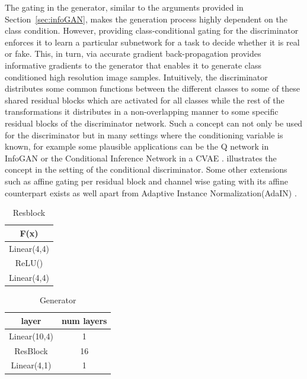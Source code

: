 The gating in the generator, similar to the arguments provided in Section~\ref{sec:infoGAN}, makes the generation process highly dependent on the class condition. However, providing class-conditional gating for the discriminator enforces it to learn a particular subnetwork for a task to decide whether it is real or fake. This, in turn, via accurate gradient back-propagation provides informative gradients to the generator that enables it to generate class conditioned high resolution image samples. Intuitively, the discriminator distributes some common functions between the different classes to some of these shared residual blocks which are activated for all classes while the rest of the transformations it distributes in a non-overlapping manner to some specific residual blocks of the discriminator network. Such a concept can not only be used for the discriminator but in many settings where the conditioning variable is known, for example some plausible applications can be the Q network in InfoGAN\cite{chen2016infogan} or the Conditional Inference Network in a CVAE \cite{sohn2015learning}.  illustrates the concept in the setting of the conditional discriminator. Some other extensions such as affine gating per residual block and channel wise gating with its affine counterpart exists as well apart from Adaptive Instance Normalization(AdaIN) \cite{huang2017arbitrary}.


\begin{table}[ht]
\caption{Resblock} %
\centering %
\begin{tabular}{c} %
\hline\hline %
F(x)\\%
\hline %
Linear(4,4)\\ %
ReLU() \\
Linear(4,4) \\
\hline %
\end{tabular}
\label{table:resblock} %
\end{table}


\begin{table}[ht]
\caption{Generator} %
\centering %
\begin{tabular}{c c} %
\hline\hline %
layer & num layers\\%
\hline %
Linear(10,4) & 1\\ %
ResBlock & 16 \\
Linear(4,1) & 1 \\
\hline %
\end{tabular}
\label{table:1d_G} %
\end{table}

